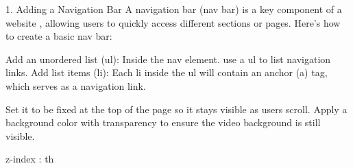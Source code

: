 1. Adding a Navigation Bar
A navigation bar (nav bar) is a key component of a website
, allowing users to quickly access different sections or pages. 
Here’s how to create a basic nav bar:

Add an unordered list (ul): Inside the nav element. use a ul to list navigation links.
Add list items (li): Each li inside the ul will contain an anchor (a) tag, which serves as a navigation link.

 Set it to be fixed at the top of the page so it stays visible as users scroll. 
Apply a background color with transparency to ensure the video background is still visible.

z-index :
th